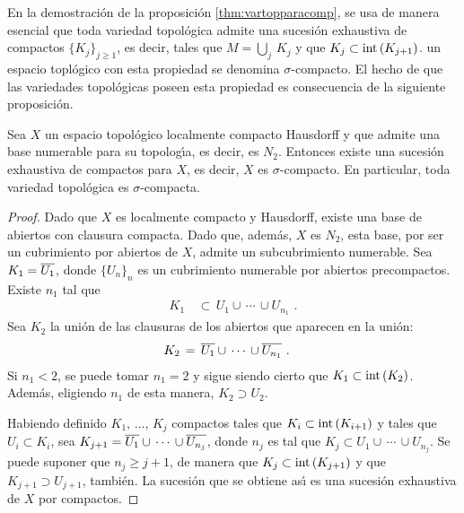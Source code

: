 \begin{remarkVarTopParacompI}\label{rem:vartopparacompI}
	En la demostraci\'{o}n de la proposici\'{o}n \ref{thm:vartopparacomp},
	se usa de manera esencial que toda variedad topol\'{o}gica admite una
	sucesi\'{o}n exhaustiva de compactos $\{K_{j}\}_{j\geq 1}$, es
	decir, tales que $M=\bigcup_{j}\,K_{j}$ y que
	$K_{j}\subset\mathrm{int}\left(K_{j+1}\right)$. un espacio topl\'{o}gico con
	esta propiedad se denomina $\sigma$-compacto. El hecho de que las
	variedades topol\'{o}gicas poseen esta propiedad es consecuencia de
	la siguiente proposici\'{o}n.
\end{remarkVarTopParacompI}

\begin{propoVarTopSigmacomp}\label{thm:vartopsigmacomp}
	Sea $X$ un espacio topol\'{o}gico localmente compacto Hausdorff y
	que admite una base numerable para su topolog\'{\i}a, es decir, es
	$N_{2}$. Entonces existe una sucesi\'{o}n exhaustiva de compactos
	para $X$, es decir, $X$ es $\sigma$-compacto. En particular, toda
	variedad topol\'{o}gica es $\sigma$-compacta.
\end{propoVarTopSigmacomp}

\begin{proof}
	Dado que $X$ es localmente compacto y Hausdorff, existe una base de
	abiertos con clausura compacta. Dado que, adem\'{a}s, $X$ es $N_{2}$,
	esta base, por ser un cubrimiento por abiertos de $X$, admite un
	subcubrimiento numerable. Sea $K_{1}=\overline{U_{1}}$, donde
	$\{U_{n}\}_{n}$ es un cubrimiento numerable por abiertos
	precompactos. Existe $n_{1}$ tal que
	\begin{align*}
		K_{1} & \,\subset\,U_{1}\cup\,\cdots\,\cup U_{n_{1}}
		\text{ .}
	\end{align*}
	Sea $K_{2}$ la uni\'{o}n de las clausuras de los abiertos que
	aparecen en la uni\'{o}n:
	\begin{align*}
		K_{2} & \,=\,\overline{U_{1}}\cup\,\cdots\,\cup\overline{U_{n_{1}}}
		\text{ .}
	\end{align*}
	Si $n_{1}<2$, se puede tomar $n_{1}=2$ y sigue siendo cierto que
	$K_{1}\subset\mathrm{int}\left(K_{2}\right)$. Adem\'{a}s, eligiendo $n_{1}$ de
	esta manera, $K_{2}\supset U_{2}$.

	Habiendo definido $K_{1},\,\dots,\,K_{j}$ compactos tales que
	$K_{i}\subset\mathrm{int}\left(K_{i+1}\right)$ y tales que $U_{i}\subset K_{i}$, sea
	$K_{j+1}=\overline{U_{1}}\cup\,\cdots\,\cup\overline{U_{n_{j}}}$, donde
	$n_{j}$ es tal que $K_{j}\subset U_{1}\cup\,\cdots\,\cup U_{n_{j}}$.
	Se puede suponer que $n_{j}\geq j+1$, de manera que
	$K_{j}\subset\mathrm{int}\left(K_{j+1}\right)$ y que $K_{j+1}\supset U_{j+1}$,
	tambi\'{e}n. La sucesi\'{o}n que se obtiene as\'{\i} es una
	sucesi\'{o}n exhaustiva de $X$ por compactos.
\end{proof}

